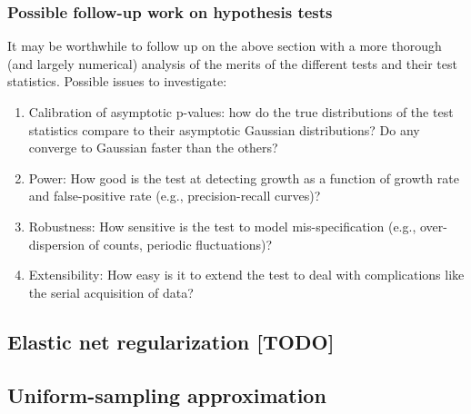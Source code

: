 \documentclass[12pt, letterpaper]{article}
\begin{document}
\subsubsection{Possible follow-up work on hypothesis tests}

It may be worthwhile to follow up on the above section with a more thorough (and largely numerical) analysis of the merits of the different tests and their test statistics.
Possible issues to investigate:
\begin{enumerate}
    \item Calibration of asymptotic p-values: how do the true distributions of the test statistics compare to their asymptotic Gaussian distributions? Do any converge to Gaussian faster than the others?
    \item Power: How good is the test at detecting growth as a function of growth rate and false-positive rate (e.g., precision-recall curves)?
    \item Robustness: How sensitive is the test to model mis-specification (e.g., over-dispersion of counts, periodic fluctuations)?
    \item Extensibility: How easy is it to extend the test to deal with complications like the serial acquisition of data?
\end{enumerate}

\subsection{Elastic net regularization [TODO]}

\subsection{Uniform-sampling approximation}
\end{document}
